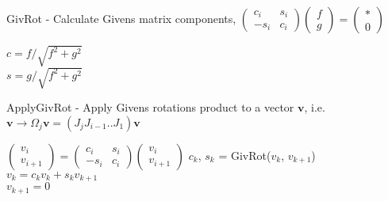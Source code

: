 \documentclass{article}
\begin{document}
\begin{algorithm}
    \DontPrintSemicolon
    \caption{GivRot - Calculate Givens matrix components, $\begin{pmatrix}c_i & s_i   \\ -s_i & c_i \end{pmatrix}  \begin{pmatrix} f \\g \end{pmatrix}  = \begin{pmatrix} * \\ 0 \end{pmatrix}$}
    $c = f / \sqrt{f^2 + g^2}$ \\
    $s = g / \sqrt{f^2 + g^2}$
\end{algorithm}

\begin{algorithm}
    \DontPrintSemicolon
    \caption{ApplyGivRot - Apply Givens rotations product to a vector $\mathbf{v}$, i.e. $\mathbf{v} \rightarrow \Omega_j \mathbf{v} = (J_jJ_{i-1}..J_1) \mathbf{v}$}
       {
        $
        \begin{pmatrix}
            v_i \\ v_{i+1}
        \end{pmatrix}
        = 
        \begin{pmatrix}
            c_i & s_i   \\ 
            -s_i & c_i 
        \end{pmatrix} 
        \begin{pmatrix}
            v_i \\ v_{i+1}
        \end{pmatrix}
        $
    }
    $c_k$, $s_k$ = GivRot($v_k$, $v_{k+1}$) \\
    $v_k = c_k v_k + s_k v_{k+1}$ \\
    $v_{k+1} = 0$
            
\end{algorithm}
  
    

\printbibliography
\end{document}
